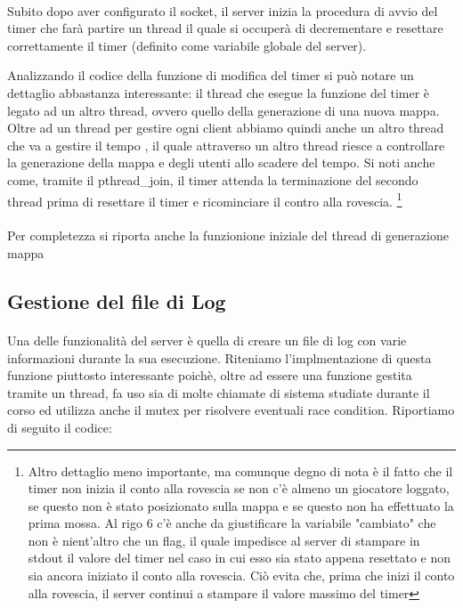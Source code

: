 \documentclass[a4paper]{article}
\begin{document}
\paragraph{}
Subito dopo aver configurato il socket, il server inizia la procedura di avvio del timer che farà partire un thread il quale si occuperà
di decrementare e resettare correttamente il timer (definito come variabile globale del server).

Analizzando il codice della funzione di modifica del timer si può notare un dettaglio abbastanza interessante: 
il thread che esegue la funzione del timer è legato ad un altro thread, ovvero quello della generazione di una nuova mappa.
Oltre ad un thread per gestire ogni client abbiamo quindi anche un altro thread che va a gestire il tempo ,
il quale attraverso un altro thread riesce a controllare la generazione della mappa e degli utenti allo scadere del tempo.
Si noti anche come, tramite il pthread\_join, il timer attenda la terminazione del secondo thread prima di resettare il timer e ricominciare il contro alla rovescia.
\footnote{Altro dettaglio meno importante, ma comunque degno di nota è il fatto che il timer non inizia il conto alla rovescia
se non c'è almeno un giocatore loggato, se questo non è stato posizionato sulla mappa e se questo non ha effettuato la prima mossa.
Al rigo 6 c'è anche da giustificare la variabile "cambiato" che non è nient'altro che un flag, il quale impedisce al server di stampare in stdout il valore del timer nel caso in cui esso sia stato appena resettato e non sia ancora iniziato il conto alla rovescia. Ciò evita che, prima che inizi il conto alla rovescia, il server continui a stampare il valore massimo del timer }
\paragraph{}
Per completezza si riporta anche la funzionione iniziale del thread di generazione mappa


\subsection{Gestione del file di Log}
\paragraph{}
Una delle funzionalità del server è quella di creare un file di log con varie informazioni durante la sua esecuzione.
Riteniamo l'implmentazione di questa funzione piuttosto interessante poichè, oltre ad essere una funzione gestita tramite un thread, fa uso sia di molte chiamate di sistema studiate durante il corso 
ed utilizza anche il mutex per risolvere eventuali race condition.
Riportiamo di seguito il codice:

\end{document}
